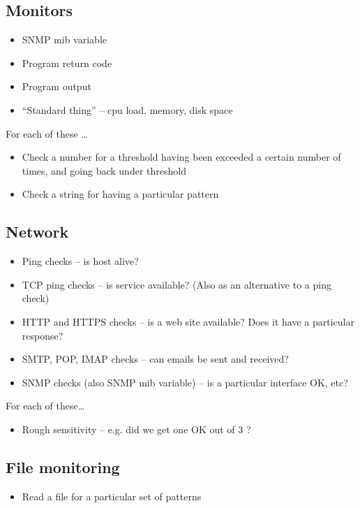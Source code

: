 \documentclass[a4paper]{article}
\begin{document}
\begin{itemize}
\subsection{Monitors}

\begin{itemize}
\item SNMP mib variable
\item Program return code
\item Program output
\item ``Standard thing'' -- cpu load, memory, disk space
\end{itemize}

For each of these \ldots
\begin{itemize}
\item Check a number for a threshold having been exceeded a certain number
 of times,  and going back under threshold
\item Check a string for having a particular pattern
\end{itemize}


\subsection{Network}

\begin{itemize}
\item Ping checks -- is host alive?
\item TCP ping checks -- is service available?  (Also as an alternative
 to a ping check)
\item HTTP and HTTPS checks -- is a web site available?  Does it have
a particular response?
\item SMTP, POP, IMAP checks -- can emails be sent and received?
\item SNMP checks (also SNMP mib variable) -- is a particular interface
 OK, etc?
\end{itemize}

For each of these\ldots
\begin{itemize}
\item Rough sensitivity -- e.g. did we get one OK out of 3 ?
\end{itemize}

\subsection{File monitoring}

\begin{itemize}
\item Read a file for a particular set of patterns
\end{itemize}



\end{itemize}
\end{document}
